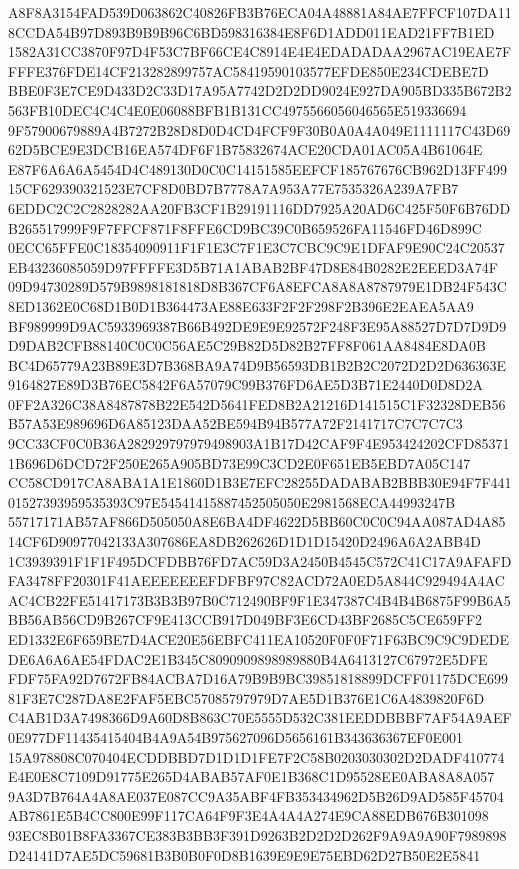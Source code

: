 \documentclass[UTF8,fontset=fandol,zihao=-4,a4paper]{ctexart}
\begin{document}
{{A8F8A3154FAD539D063862C40826FB3B76ECA04A48881A84AE7FFCF107DA118CCDA54B97D893B9B9B96C6BD598316384E8F6D1ADD011EAD21FF7B1ED
1582A31CC3870F97D4F53C7BF66CE4C8914E4E4EDADADAA2967AC19EAE7FFFFE376FDE14CF213282899757AC58419590103577EFDE850E234CDEBE7D
BBE0F3E7CE9D433D2C33D17A95A7742D2D2DD9024E927DA905BD335B672B2563FB10DEC4C4C4E0E06088BFB1B131CC4975566056046565E519336694
9F57900679889A4B7272B28D8D0D4CD4FCF9F30B0A0A4A049E1111117C43D6962D5BCE9E3DCB16EA574DF6F1B75832674ACE20CDA01AC05A4B61064E
E87F6A6A6A5454D4C489130D0C0C14151585EEFCF185767676CB962D13FF49915CF629390321523E7CF8D0BD7B7778A7A953A77E7535326A239A7FB7
6EDDC2C2C2828282AA20FB3CF1B29191116DD7925A20AD6C425F50F6B76DDB265517999F9F7FFCF871F8FFE6CD9BC39C0B659526FA11546FD46D899C
0ECC65FFE0C18354090911F1F1E3C7F1E3C7CBC9C9E1DFAF9E90C24C20537EB43236085059D97FFFFE3D5B71A1ABAB2BF47D8E84B0282E2EEED3A74F
09D94730289D579B9898181818D8B367CF6A8EFCA8A8A8787979E1DB24F543C8ED1362E0C68D1B0D1B364473AE88E633F2F2F298F2B396E2EAEA5AA9
BF989999D9AC5933969387B66B492DE9E9E92572F248F3E95A88527D7D7D9D9D9DAB2CFB88140C0C0C56AE5C29B82D5D82B27FF8F061AA8484E8DA0B
BC4D65779A23B89E3D7B368BA9A74D9B56593DB1B2B2C2072D2D2D636363E9164827E89D3B76EC5842F6A57079C99B376FD6AE5D3B71E2440D0D8D2A
0FF2A326C38A8487878B22E542D5641FED8B2A21216D141515C1F32328DEB56B57A53E989696D6A85123DAA52BE594B94B577A72F2141717C7C7C7C3
9CC33CF0C0B36A282929797979498903A1B17D42CAF9F4E953424202CFD853711B696D6DCD72F250E265A905BD73E99C3CD2E0F651EB5EBD7A05C147
CC58CD917CA8ABA1A1E1860D1B3E7EFC28255DADABAB2BBB30E94F7F44101527393959535393C97E54541415887452505050E2981568ECA44993247B
55717171AB57AF866D505050A8E6BA4DF4622D5BB60C0C0C94AA087AD4A8514CF6D90977042133A307686EA8DB262626D1D1D15420D2496A6A2ABB4D
1C3939391F1F1F495DCFDBB76FD7AC59D3A2450B4545C572C41C17A9AFAFDFA3478FF20301F41AEEEEEEEFDFBF97C82ACD72A0ED5A844C929494A4AC
AC4CB22FE51417173B3B3B97B0C712490BF9F1E347387C4B4B4B6875F99B6A5BB56AB56CD9B267CF9E413CCB917D049BF3E6CD43BF2685C5CE659FF2
ED1332E6F659BE7D4ACE20E56EBFC411EA10520F0F0F71F63BC9C9C9DEDEDE6A6A6AE54FDAC2E1B345C8090909898989880B4A6413127C67972E5DFE
FDF75FA92D7672FB84ACBA7D16A79B9B9BC39851818899DCFF01175DCE69981F3E7C287DA8E2FAF5EBC57085797979D7AE5D1B376E1C6A4839820F6D
C4AB1D3A7498366D9A60D8B863C70E5555D532C381EEDDBBBF7AF54A9AEF0E977DF11435415404B4A9A54B975627096D5656161B343636367EF0E001
15A978808C070404ECDDBBD7D1D1D1FE7F2C58B0203030302D2DADF410774E4E0E8C7109D91775E265D4ABAB57AF0E1B368C1D95528EE0ABA8A8A057
9A3D7B764A4A8AE037E087CC9A35ABF4FB353434962D5B26D9AD585F45704AB7861E5B4CC800E99F117CA64F9F3E4A4A4A274E9CA88EDB676B301098
93EC8B01B8FA3367CE383B3BB3F391D9263B2D2D2D262F9A9A9A90F7989898D24141D7AE5DC59681B3B0B0F0D8B1639E9E9E75EBD62D27B50E2E5841
}}
\end{document}
